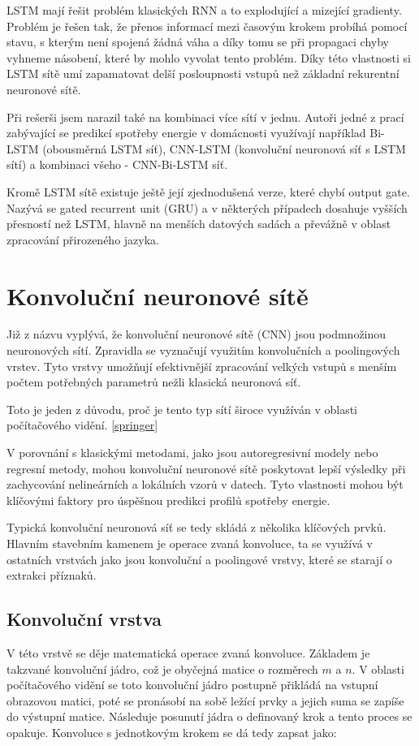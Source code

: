 \documentclass[FM,BP,fonts]{tulthesis}
\begin{document}
LSTM mají řešit problém klasických RNN a to explodující a mizející gradienty. Problém je řešen tak, že přenos informací mezi časovým krokem probíhá pomocí stavu, s kterým není spojená žádná váha a díky tomu se při propagaci chyby vyhneme násobení, které by mohlo vyvolat tento problém. Díky této vlastnosti si LSTM sítě umí zapamatovat delší posloupnosti vstupů než základní rekurentní neuronové sítě.

Při rešerši jsem narazil také na kombinaci více sítí v jednu. Autoři jedné z prací zabývající se predikcí spotřeby energie v domácnosti \cite{cnn-bi-lstm}	 využívají například Bi-LSTM (obousměrná LSTM síť), CNN-LSTM (konvoluční neuronová síť s LSTM sítí) a kombinaci všeho - CNN-Bi-LSTM síť.

Kromě LSTM sítě existuje ještě její zjednodušená verze, které chybí output gate. Nazývá se gated recurrent unit (GRU) a v některých případech dosahuje vyšších přesností než LSTM, hlavně na menších datových sadách a převážně v oblast zpracování přirozeného jazyka. \cite{kynych2018vyuziti}

\section{Konvoluční neuronové sítě}
Již z názvu vyplývá, že konvoluční neuronové sítě (CNN) jsou podmnožinou neuronových sítí. Zpravidla se vyznačují využitím konvolučních a poolingových vrstev. Tyto vrstvy umožňují efektivnější zpracování velkých vstupů s menším počtem potřebných parametrů nežli klasická neuronová síť. 

Toto je jeden z důvodu, proč je tento typ sítí široce využíván v oblasti počítačového vidění. \ref{springer}

V porovnání s klasickými metodami, jako jsou autoregresivní modely nebo regresní metody, mohou konvoluční neuronové sítě poskytovat lepší výsledky při zachycování nelineárních a lokálních vzorů v datech. Tyto vlastnosti mohou být klíčovými faktory pro úspěšnou predikci profilů spotřeby energie.

Typická konvoluční neuronová síť se tedy skládá z několika klíčových prvků. Hlavním stavebním kamenem je operace zvaná konvoluce, ta se využívá v ostatních vrstvách jako jsou konvoluční a poolingové vrstvy, které se starají o extrakci příznaků.

\subsection{Konvoluční vrstva}
V této vrstvě se děje matematická operace zvaná konvoluce. Základem je takzvané konvoluční jádro, což je obyčejná matice o rozměrech $m$ a $n$. V oblasti počítačového vidění se toto konvoluční jádro postupně přikládá na vstupní obrazovou matici, poté se pronásobí na sobě ležící prvky a jejich suma se zapíše do výstupní matice. Následuje posunutí jádra o definovaný krok a tento proces se opakuje. Konvoluce s jednotkovým krokem se dá tedy zapsat jako:
\end{document}
